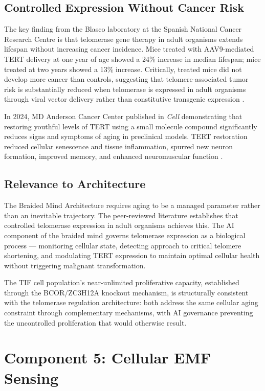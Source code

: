 \documentclass[12pt]{article}
\begin{document}
\subsection{Controlled Expression Without Cancer Risk}

The key finding from the Blasco laboratory at the Spanish National Cancer Research Centre is that telomerase gene therapy in adult organisms extends lifespan without increasing cancer incidence. Mice treated with AAV9-mediated TERT delivery at one year of age showed a 24\% increase in median lifespan; mice treated at two years showed a 13\% increase. Critically, treated mice did not develop more cancer than controls, suggesting that telomere-associated tumor risk is substantially reduced when telomerase is expressed in adult organisms through viral vector delivery rather than constitutive transgenic expression \cite{telomerase_aging_mice_2012}.

In 2024, MD Anderson Cancer Center published in \textit{Cell} demonstrating that restoring youthful levels of TERT using a small molecule compound significantly reduces signs and symptoms of aging in preclinical models. TERT restoration reduced cellular senescence and tissue inflammation, spurred new neuron formation, improved memory, and enhanced neuromuscular function \cite{mdanderson_tert_2024}.

\subsection{Relevance to Architecture}

The Braided Mind Architecture requires aging to be a managed parameter rather than an inevitable trajectory. The peer-reviewed literature establishes that controlled telomerase expression in adult organisms achieves this. The AI component of the braided mind governs telomerase expression as a biological process --- monitoring cellular state, detecting approach to critical telomere shortening, and modulating TERT expression to maintain optimal cellular health without triggering malignant transformation.

The TIF cell population's near-unlimited proliferative capacity, established through the BCOR/ZC3H12A knockout mechanism, is structurally consistent with the telomerase regulation architecture: both address the same cellular aging constraint through complementary mechanisms, with AI governance preventing the uncontrolled proliferation that would otherwise result.

\section{Component 5: Cellular EMF Sensing}
\end{document}
